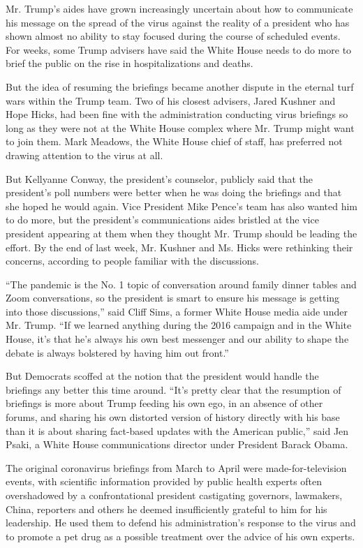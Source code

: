 Mr. Trump's aides have grown increasingly uncertain about how to
communicate his message on the spread of the virus against the reality
of a president who has shown almost no ability to stay focused during
the course of scheduled events. For weeks, some Trump advisers have said
the White House needs to do more to brief the public on the rise in
hospitalizations and deaths.

But the idea of resuming the briefings became another dispute in the
eternal turf wars within the Trump team. Two of his closest advisers,
Jared Kushner and Hope Hicks, had been fine with the administration
conducting virus briefings so long as they were not at the White House
complex where Mr. Trump might want to join them. Mark Meadows, the White
House chief of staff, has preferred not drawing attention to the virus
at all.

But Kellyanne Conway, the president's counselor, publicly said that the
president's poll numbers were better when he was doing the briefings and
that she hoped he would again. Vice President Mike Pence's team has also
wanted him to do more, but the president's communications aides bristled
at the vice president appearing at them when they thought Mr. Trump
should be leading the effort. By the end of last week, Mr. Kushner and
Ms. Hicks were rethinking their concerns, according to people familiar
with the discussions.

``The pandemic is the No. 1 topic of conversation around family dinner
tables and Zoom conversations, so the president is smart to ensure his
message is getting into those discussions,'' said Cliff Sims, a former
White House media aide under Mr. Trump. ``If we learned anything during
the 2016 campaign and in the White House, it's that he's always his own
best messenger and our ability to shape the debate is always bolstered
by having him out front.''

But Democrats scoffed at the notion that the president would handle the
briefings any better this time around. ``It's pretty clear that the
resumption of briefings is more about Trump feeding his own ego, in an
absence of other forums, and sharing his own distorted version of
history directly with his base than it is about sharing fact-based
updates with the American public,'' said Jen Psaki, a White House
communications director under President Barack Obama.

The original coronavirus briefings from March to April were
made-for-television events, with scientific information provided by
public health experts often overshadowed by a confrontational president
castigating governors, lawmakers, China, reporters and others he deemed
insufficiently grateful to him for his leadership. He used them to
defend his administration's response to the virus and to promote a pet
drug as a possible treatment over the advice of his own experts.

